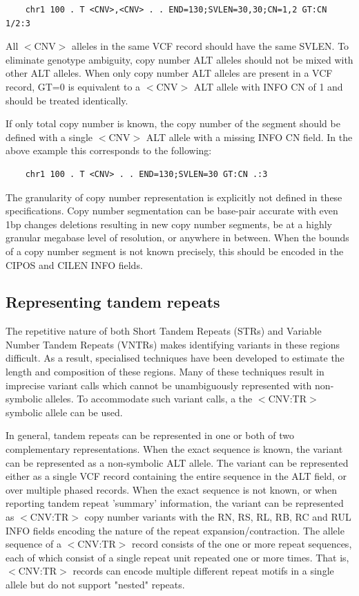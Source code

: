 \documentclass[8pt]{article}
\begin{document}
\footnotesize
\begin{verbatim}
	chr1 100 . T <CNV>,<CNV> . . END=130;SVLEN=30,30;CN=1,2 GT:CN 1/2:3
\end{verbatim}
\normalsize

All $<$CNV$>$ alleles in the same VCF record should have the same SVLEN.
To eliminate genotype ambiguity, copy number ALT alleles should not be mixed with other ALT alleles.
When only copy number ALT alleles are present in a VCF record, GT=0 is equivalent to a $<$CNV$>$ ALT allele with INFO CN of 1 and should be treated identically.

If only total copy number is known, the copy number of the segment should be defined with a single $<$CNV$>$ ALT allele with a missing INFO CN field.
In the above example this corresponds to the following:

\footnotesize
\begin{verbatim}
	chr1 100 . T <CNV> . . END=130;SVLEN=30 GT:CN .:3
\end{verbatim}
\normalsize

The granularity of copy number representation is explicitly not defined in these specifications.
Copy number segmentation can be base-pair accurate with even 1bp changes deletions resulting in new copy number segments, be at a highly granular megabase level of resolution, or anywhere in between.
When the bounds of a copy number segment is not known precisely, this should be encoded in the CIPOS and CILEN INFO fields.

\pagebreak
\subsection{Representing tandem repeats}
\label{tandem-repeats}

The repetitive nature of both Short Tandem Repeats (STRs) and Variable Number Tandem Repeats (VNTRs) makes identifying variants in these regions difficult.
As a result, specialised techniques have been developed to estimate the length and composition of these regions.
Many of these techniques result in imprecise variant calls which cannot be unambiguously represented with non-symbolic alleles.
To accommodate such variant calls, a the $<$CNV:TR$>$ symbolic allele can be used.

In general, tandem repeats can be represented in one or both of two complementary representations.
When the exact sequence is known, the variant can be represented as a non-symbolic ALT allele.
The variant can be represented either as a single VCF record containing the entire sequence in the ALT field, or over multiple phased records.
When the exact sequence is not known, or when reporting tandem repeat 'summary' information, the variant can be represented as $<$CNV:TR$>$ copy number variants with the RN, RS, RL, RB, RC and RUL INFO fields encoding the nature of the repeat expansion/contraction.
The allele sequence of a $<$CNV:TR$>$ record consists of the one or more repeat sequences, each of which consist of a single repeat unit repeated one or more times.
That is, $<$CNV:TR$>$ records can encode multiple different repeat motifs in a single allele but do not support "nested" repeats.
\end{document}
